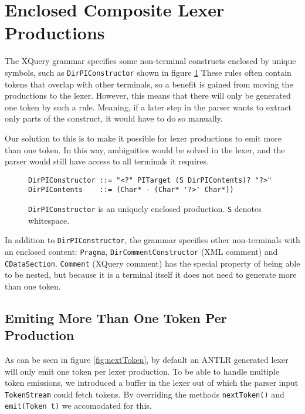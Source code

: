 \section{Enclosed Composite Lexer Productions}
\label{sect:rewriteGrammar:enclosedComposite}
The XQuery grammar specifies some non-terminal constructs enclosed by unique symbols, such as \verb!DirPIConstructor! shown in figure \ref{fig:pitarget} These rules often contain tokens that overlap with other terminals, so a benefit is gained from moving the productions to the lexer. However, this means that there will only be generated one token by such a rule. Meaning, if a later step in the parser wants to extract only parts of the construct, it would have to do so manually. 

Our solution to this is to make it possible for lexer productions to emit more than one token. In this way, ambiguities would be solved in the lexer, and the parser would still have access to all terminals it requires.

\begin{figure}[h!]
\begin{Verbatim}
DirPIConstructor ::= "<?" PITarget (S DirPIContents)? "?>"
DirPIContents    ::= (Char* - (Char* '?>' Char*))
\end{Verbatim}
\label{fig:pitarget}
\caption[An enclosed production]{\texttt{DirPIConstructor} is an uniquely enclosed production. \texttt{S} denotes whitespace.}
\end{figure}

In addition to \verb!DirPIConstructor!, the grammar specifies other non-terminals with an enclosed content: \verb!Pragma!,  \verb!DirCommentConstructor! (XML comment) and \verb!CDataSection!. \verb!Comment! (XQuery comment) has the special property of being able to be nested, but because it is a terminal itself it does not need to generate more than one token.

\subsection{Emiting More Than One Token Per Production}
\label{sect:implementation:emittingMoreTokens}
As can be seen in figure \ref{fig:nextToken}, by default an ANTLR generated
lexer will only emit one token per lexer production. To be able to handle
multiple token emissions, we introduced a buffer in the lexer out of which the
parser input \verb!TokenStream! could fetch tokens. By overriding the methods
\verb!nextToken()! and \verb!emit(Token t)! we accomodated for this.  


